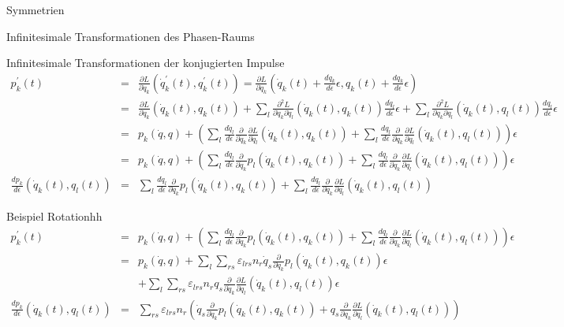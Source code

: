 \documentclass[a4paper,fleqn]{article}
\numberwithin{equation}{section}
\begin{document}
\begin{section}{Symmetrien}
\begin{subsection}{Infinitesimale Transformationen des Phasen-Raums}
\begin{subsubsection}{Infinitesimale Transformationen der konjugierten Impulse}
\begin{eqnarray*}
p_k^\prime(t) &=& \frac{\partial L}{\partial \dot{q}_k}(\dot{q}^\prime_k(t),q^\prime_k(t))
=\frac{\partial L}{\partial \dot{q}_k}\left(\dot{q}_k(t)+\frac{d\dot{q}_k}{d\epsilon}\epsilon,q_k(t)+\frac{dq_k}{d\epsilon}\epsilon\right)\\
&=& \frac{\partial L}{\partial \dot{q}_k}\left(\dot{q}_k(t),q_k(t)\right)
+\sum_l\frac{\partial^2 L}{\partial \dot{q}_k\partial \dot{q}_l}\left(\dot{q}_k(t),q_k(t)\right)\frac{d\dot{q}_l}{d\epsilon}\epsilon
+\sum_l\frac{\partial^2 L}{\partial \dot{q}_k\partial q_l}\left(\dot{q}_k(t),q_l(t)\right)\frac{dq_l}{d\epsilon}\epsilon\\
&=& p_k(\dot{q},q)
+\left(\sum_l\frac{d\dot{q}_l}{d\epsilon}\frac{\partial}{\partial \dot{q}_k}\frac{\partial L}{\partial \dot{q}_l}\left(\dot{q}_k(t),q_k(t)\right)
+\sum_l\frac{dq_l}{d\epsilon}\frac{\partial}{\partial \dot{q}_k}\frac{\partial L}{\partial q_l}\left(\dot{q}_k(t),q_l(t)\right)\right)\epsilon\\
&=& p_k(\dot{q},q)
+\left(\sum_l\frac{d\dot{q}_l}{d\epsilon}\frac{\partial}{\partial \dot{q}_k}p_l\left(\dot{q}_k(t),q_k(t)\right)
+\sum_l\frac{dq_l}{d\epsilon}\frac{\partial}{\partial \dot{q}_k}\frac{\partial L}{\partial q_l}\left(\dot{q}_k(t),q_l(t)\right)\right)\epsilon\\
\frac{dp_k}{d\epsilon}\left(\dot{q}_k(t),q_l(t)\right) &=&\sum_l\frac{d\dot{q}_l}{d\epsilon}\frac{\partial}{\partial \dot{q}_k}p_l\left(\dot{q}_k(t),q_k(t)\right)
+\sum_l\frac{dq_l}{d\epsilon}\frac{\partial}{\partial \dot{q}_k}\frac{\partial L}{\partial q_l}\left(\dot{q}_k(t),q_l(t)\right)
\end{eqnarray*}
\begin{paragraph}{Beispiel Rotation}hh
\begin{eqnarray*}
p_k^\prime(t) &=& p_k(\dot{q},q)
+\left(\sum_l\frac{d\dot{q}_l}{d\epsilon}\frac{\partial}{\partial \dot{q}_k}p_l\left(\dot{q}_k(t),q_k(t)\right)
+\sum_l\frac{dq_l}{d\epsilon}\frac{\partial}{\partial \dot{q}_k}\frac{\partial L}{\partial q_l}\left(\dot{q}_k(t),q_l(t)\right)\right)\epsilon\\
&=& p_k(\dot{q},q)+\sum_l\sum_{rs}\varepsilon_{lrs}n_r\dot{q}_s\frac{\partial}{\partial \dot{q}_k}p_l\left(\dot{q}_k(t),q_k(t)\right)\epsilon\\
&&+\sum_l\sum_{rs}\varepsilon_{lrs}n_rq_s\frac{\partial}{\partial \dot{q}_k}\frac{\partial L}{\partial q_l}\left(\dot{q}_k(t),q_l(t)\right)\epsilon\\
\frac{dp_k}{d\epsilon}\left(\dot{q}_k(t),q_l(t)\right) &=&
\sum_{rs}\varepsilon_{lrs}n_r\left(\dot{q}_s\frac{\partial}{\partial \dot{q}_k}p_l\left(\dot{q}_k(t),q_k(t)\right)
+q_s\frac{\partial}{\partial \dot{q}_k}\frac{\partial L}{\partial q_l}\left(\dot{q}_k(t),q_l(t)\right)\right)
\end{eqnarray*}
\end{paragraph}
\end{subsubsection}


\end{subsection}
\end{section}
\end{document}

